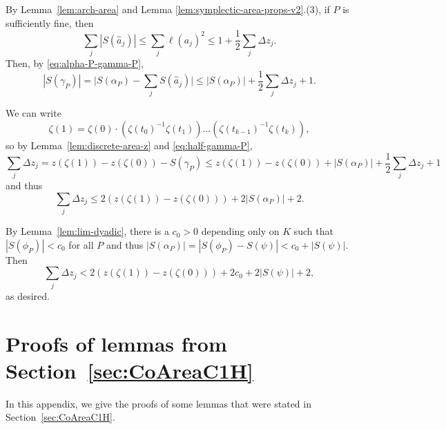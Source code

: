 \documentclass[12pt,reqno]{amsart}
\theoremstyle{remark}
\newcommand{\0}{\mathbf{0}}
\renewcommand{\1}{\mathbf 1}
\begin{document}
  By Lemma~\ref{lem:arch-area} and Lemma \ref{lem:symplectic-area-props-v2}.(3), if $P$ is sufficiently fine, then
  \begin{equation}\label{eq:half-bound}
    \sum_j |S(\hat{a}_j)| \le \sum_j \ell(a_j)^2 \le 1 + \frac{1}{2} \sum_j \Delta z_j.
  \end{equation}
  Then, by \eqref{eq:alpha-P-gamma-P},
  \begin{equation}\label{eq:half-gamma-P}
    |S(\gamma_P)| = \bigg|S(\alpha_P)-\sum_j S(\hat{a}_j)\bigg| \le |S(\alpha_P)| + \frac{1}{2} \sum_j \Delta z_j +  1.
  \end{equation}
  
  We can write
  $$\zeta(1) = \zeta(0)\cdot \left(\zeta(t_0)^{-1}\zeta(t_1)\right)\dots \left(\zeta(t_{k-1})^{-1} \zeta(t_{k})\right),$$
  so by Lemma~\ref{lem:discrete-area-z} and \eqref{eq:half-gamma-P},
  \begin{equation}\label{eq:zj-first}
    \sum_j \Delta z_j  = z(\zeta(1)) - z(\zeta(0)) - S(\gamma_P) \le z(\zeta(1)) - z(\zeta(0)) + |S(\alpha_P)| + \frac{1}{2} \sum_j \Delta z_j + 1
  \end{equation}
  and thus
  $$\sum_j \Delta z_j \le 2(z(\zeta(1)) - z(\zeta(0))) + 2 |S(\alpha_P)| + 2.$$

  By Lemma~\ref{lem:lim-dyadic}, there
  is a $c_0>0$ depending only on $K$ such that $|S(\phi_P)|< c_0$ for all $P$ and thus $|S(\alpha_P)| = |S(\phi_P) - S(\psi)| < c_0 + |S(\psi)|$.
  Then 
  $$\sum_j \Delta z_j < 2(z(\zeta(1)) - z(\zeta(0))) + 2 c_0 + 2 |S(\psi)| + 2,$$
  as desired. 

\appendix

\section{Proofs of lemmas from Section~\ref{sec:CoAreaC1H}}\label{app:vertical-curves}

In this appendix, we give the proofs of some lemmas that were stated in Section~\ref{sec:CoAreaC1H}.
\end{document}
